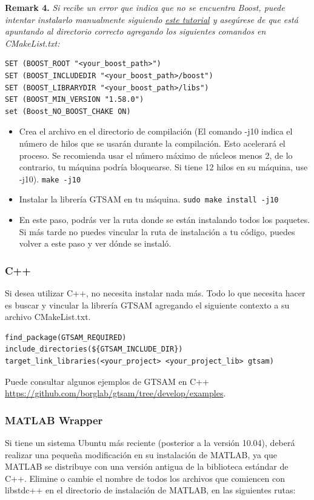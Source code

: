 \documentclass[tp]{lcc}
\begin{document}
\textbf{Remark 4.} \textit{Si recibe un error que indica que no se encuentra Boost, puede intentar instalarlo manualmente siguiendo \href{https://www.boost.org/doc/libs/1_66_0/more/getting_started/unix-variants.html\#get-boost}{este tutorial} y asegúrese de que está apuntando al directorio correcto agregando los siguientes comandos en CMakeList.txt:}

\begin{lstlisting}[style=bash]
SET (BOOST_ROOT "<your_boost_path>")
SET (BOOST_INCLUDEDIR "<your_boost_path>/boost")
SET (BOOST_LIBRARYDIR "<your_boost_path>/libs")
SET (BOOST_MIN_VERSION "1.58.0")
set (Boost_NO_BOOST_CHAKE ON)
\end{lstlisting}

\begin{itemize}
    \item Crea el archivo en el directorio de compilación (El comando -j10 indica el número de hilos que se usarán durante la compilación. Esto acelerará el proceso. Se recomienda usar el número máximo de núcleos menos 2, de lo contrario, tu máquina podría bloquearse. Si tiene 12 hilos en su máquina, use -j10). \lstinline[style=bash]{make -j10}
    \item Instalar la librería GTSAM en tu máquina. \lstinline[style=bash]{sudo make install -j10}
    \item En este paso, podrás ver la ruta donde se están instalando todos los paquetes. Si más tarde no puedes vincular la ruta de instalación a tu código, puedes volver a este paso y ver dónde se instaló.
\end{itemize}

\subsubsection*{C++}
Si desea utilizar C++, no necesita instalar nada más. Todo lo que necesita hacer es buscar y vincular la librería GTSAM agregando el siguiente contexto a su archivo CMakeList.txt.

\begin{lstlisting}[style=cmake]
find_package(GTSAM_REQUIRED)
include_directories(${GTSAM_INCLUDE_DIR})
target_link_libraries(<your_project> <your_project_lib> gtsam)
\end{lstlisting}

Puede consultar algunos ejemplos de GTSAM en C++ \url{https://github.com/borglab/gtsam/tree/develop/examples}.

\subsubsection*{MATLAB Wrapper}
Si tiene un sistema Ubuntu más reciente (posterior a la versión 10.04), deberá realizar una pequeña modificación en su instalación de MATLAB, ya que MATLAB se distribuye con una versión antigua de la biblioteca estándar de C++. Elimine o cambie el nombre de todos los archivos que comiencen con libstdc++ en el directorio de instalación de MATLAB, en las siguientes rutas:
\end{document}
